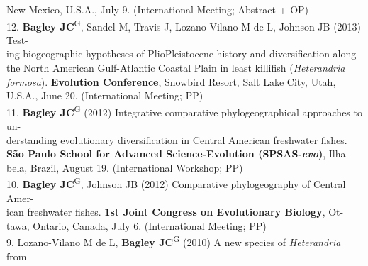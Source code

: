 \documentclass[margin,line]{res}
\begin{document}
\begin{resume}
\hspace*{8mm}New Mexico, U.S.A., July 9. (International Meeting; Abstract + OP) \\
12. \textbf{Bagley JC}\textsuperscript{G}, Sandel M, Travis J, Lozano-Vilano M de L, Johnson JB (2013) Test-\\
\hspace*{8mm} ing biogeographic hypotheses of Plio\textemdash Pleistocene history and diversification along the North American Gulf-Atlantic Coastal Plain in least killifish (\emph{Heterandria}\\
\hspace*{8mm} \emph{formosa}). \textbf{Evolution Conference}, Snowbird Resort, Salt Lake City, Utah,\\ \vspace{2mm}
\hspace*{8mm}U.S.A., June 20. (International Meeting; PP) \\
11. \textbf{Bagley JC}\textsuperscript{G} (2012) Integrative comparative phylogeographical approaches to un-\\
\hspace*{8mm} derstanding evolutionary diversification in Central American freshwater fishes.\\
\hspace*{8mm} \textbf{S\~{a}o Paulo School for Advanced Science-Evolution (SPSAS-\emph{evo})}, Ilha-\\ \vspace{2mm}
\hspace*{8mm}bela, Brazil, August 19. (International Workshop; PP) \\
10. \textbf{Bagley JC}\textsuperscript{G}, Johnson JB (2012) Comparative phylogeography of Central Amer-\\
\hspace*{8mm} ican freshwater fishes. \textbf{1st Joint Congress on Evolutionary Biology}, Ot-\\ \vspace{2mm}
\hspace*{8mm}tawa, Ontario, Canada, July 6. (International Meeting; PP) \\
9. Lozano-Vilano M de L, \textbf{Bagley JC}\textsuperscript{G} (2010) A new species of \emph{Heterandria} from\\

\end{resume}
\end{document}

